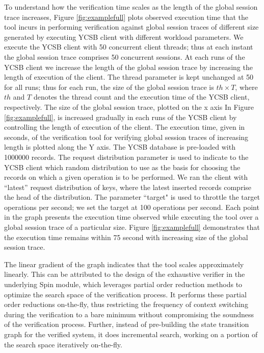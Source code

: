 \documentclass[journal,compsoc]{IEEEtran}
\begin{document}
\par  To understand how the verification time scales as the length of the global session trace increases, Figure \ref{fig:examplefull} plots observed execution time that the tool incurs in performing verification against global session traces of different size generated by executing YCSB client with different workload parameters. We execute the YCSB client with 50 concurrent client threads; thus at each instant the global session trace comprises 50 concurrent sessions. At each runs of the YCSB client we increase the length of the global session trace by increasing the length of execution of the client. The thread parameter is kept unchanged at 50 for all runs; thus for each run, the size of the global session trace is $\mathit{th} \times T$,  where $\mathit{th}$ and  $T$ denotes the thread count and the execution time of the YCSB client, respectively. The size of the global session trace, plotted on the x axis In Figure \ref{fig:examplefull},  is increased gradually in each runs of the YCSB client by controlling the length of execution of the client.  The execution time, given in seconds, of the verification tool for verifying global session traces of increasing length is plotted along the Y axis. The YCSB database is pre-loaded with 1000000 records.  The request distribution parameter is used to indicate to the YCSB client which random distribution to use as the basis for choosing the records on which a given operation is to be performed. We ran the client with ``latest'' request distribution of keys, where the latest inserted records comprise the head of the distribution. The parameter ``target" is used to throttle  the target  operations per second; we set the target at 100  operations per second.  Each point in the graph presents the  execution time observed while executing the  tool over a global session trace of a particular size. Figure  \ref{fig:examplefull} demonstrates that the execution time remains within 75 second with increasing size of the global session trace.  
\par The linear gradient of the graph  indicates that the tool scales approximately linearly. 
This can be attributed to the design of the exhaustive verifier in the underlying Spin module, which leverages partial order reduction methods to optimize the search space of the verification process.  It performs these partial order reductions on-the-fly, thus restricting the frequency of context switching during the verification to a bare minimum without compromising the soundness of the verification process.  Further, instead of pre-building the state transition graph  for the verified system, it does incremental search, working on a portion of the search space iteratively on-the-fly.  
\end{document}
